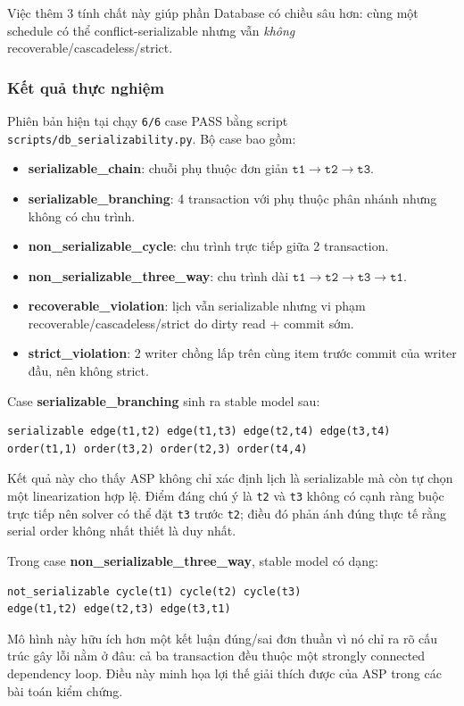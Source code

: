 ﻿\documentclass[11pt,a4paper]{article}
\begin{document}
Việc thêm 3 tính chất này giúp phần Database có chiều sâu hơn: cùng một schedule có thể conflict-serializable nhưng vẫn \textit{không} recoverable/cascadeless/strict.

\subsubsection*{Kết quả thực nghiệm}
 Phiên bản hiện tại chạy \texttt{6/6} case PASS bằng script \texttt{scripts/db\_serializability.py}. Bộ case bao gồm:
\begin{itemize}[leftmargin=1.5em]
  \item \textbf{serializable\_chain}: chuỗi phụ thuộc đơn giản \(\texttt{t1} \rightarrow \texttt{t2} \rightarrow \texttt{t3}\).
  \item \textbf{serializable\_branching}: 4 transaction với phụ thuộc phân nhánh nhưng không có chu trình.
  \item \textbf{non\_serializable\_cycle}: chu trình trực tiếp giữa 2 transaction.
  \item \textbf{non\_serializable\_three\_way}: chu trình dài \(\texttt{t1} \rightarrow \texttt{t2} \rightarrow \texttt{t3} \rightarrow \texttt{t1}\).
  \item \textbf{recoverable\_violation}: lịch vẫn serializable nhưng vi phạm recoverable/cascadeless/strict do dirty read + commit sớm.
  \item \textbf{strict\_violation}: 2 writer chồng lấp trên cùng item trước commit của writer đầu, nên không strict.
\end{itemize}

Case \textbf{serializable\_branching} sinh ra stable model sau:
\begin{lstlisting}[language={}]
serializable edge(t1,t2) edge(t1,t3) edge(t2,t4) edge(t3,t4)
order(t1,1) order(t3,2) order(t2,3) order(t4,4)
\end{lstlisting}

Kết quả này cho thấy ASP không chỉ xác định lịch là serializable mà còn tự chọn một linearization hợp lệ. Điểm đáng chú ý là \texttt{t2} và \texttt{t3} không có cạnh ràng buộc trực tiếp nên solver có thể đặt \texttt{t3} trước \texttt{t2}; điều đó phản ánh đúng thực tế rằng serial order không nhất thiết là duy nhất.

Trong case \textbf{non\_serializable\_three\_way}, stable model có dạng:
\begin{lstlisting}[language={}]
not_serializable cycle(t1) cycle(t2) cycle(t3)
edge(t1,t2) edge(t2,t3) edge(t3,t1)
\end{lstlisting}
Mô hình này hữu ích hơn một kết luận đúng/sai đơn thuần vì nó chỉ ra rõ cấu trúc gây lỗi nằm ở đâu: cả ba transaction đều thuộc một strongly connected dependency loop. Điều này minh họa lợi thế giải thích được của ASP trong các bài toán kiểm chứng.
\end{document}
